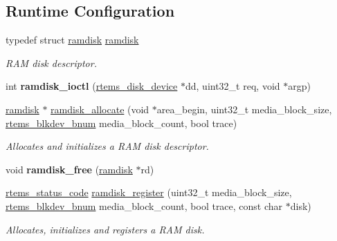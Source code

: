 \subsection*{Runtime Configuration}
\begin{DoxyCompactItemize}
\item 
\mbox{\label{group__rtems__ramdisk_ga15e8cae26f73519967429dcfc38d8efd}} 
typedef struct \mbox{\hyperlink{structramdisk}{ramdisk}} \mbox{\hyperlink{group__rtems__ramdisk_ga15e8cae26f73519967429dcfc38d8efd}{ramdisk}}
\begin{DoxyCompactList}\small\item\em R\+AM disk descriptor. \end{DoxyCompactList}\item 
\mbox{\label{group__rtems__ramdisk_ga7038c2c976bd632ecdb9a0662ab65a4b}} 
int {\bfseries ramdisk\+\_\+ioctl} (\mbox{\hyperlink{structrtems__disk__device}{rtems\+\_\+disk\+\_\+device}} $\ast$dd, uint32\+\_\+t req, void $\ast$argp)
\item 
\mbox{\hyperlink{structramdisk}{ramdisk}} $\ast$ \mbox{\hyperlink{group__rtems__ramdisk_gac6c99eed9f3b92bb4cf5184b25972e65}{ramdisk\+\_\+allocate}} (void $\ast$area\+\_\+begin, uint32\+\_\+t media\+\_\+block\+\_\+size, \mbox{\hyperlink{group__rtems__disk_ga5fbcfd40b657bff6c54d9e393fab3274}{rtems\+\_\+blkdev\+\_\+bnum}} media\+\_\+block\+\_\+count, bool trace)
\begin{DoxyCompactList}\small\item\em Allocates and initializes a R\+AM disk descriptor. \end{DoxyCompactList}\item 
\mbox{\label{group__rtems__ramdisk_gac1ac2e67477fcd42c3f0837382542727}} 
void {\bfseries ramdisk\+\_\+free} (\mbox{\hyperlink{structramdisk}{ramdisk}} $\ast$rd)
\item 
\mbox{\hyperlink{group__ClassicStatus_ga545d41846817eaba6143d52ee4d9e9fe}{rtems\+\_\+status\+\_\+code}} \mbox{\hyperlink{group__rtems__ramdisk_ga22e8a306b2cac6ab0dd029788e33641e}{ramdisk\+\_\+register}} (uint32\+\_\+t media\+\_\+block\+\_\+size, \mbox{\hyperlink{group__rtems__disk_ga5fbcfd40b657bff6c54d9e393fab3274}{rtems\+\_\+blkdev\+\_\+bnum}} media\+\_\+block\+\_\+count, bool trace, const char $\ast$disk)
\begin{DoxyCompactList}\small\item\em Allocates, initializes and registers a R\+AM disk. \end{DoxyCompactList}\end{DoxyCompactItemize}


